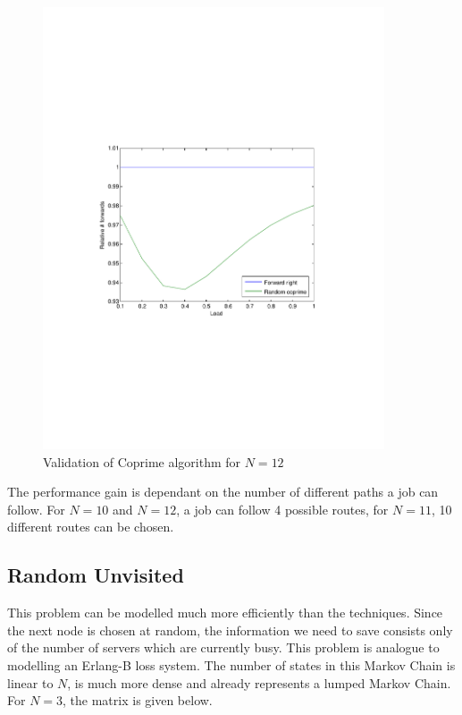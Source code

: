 \documentclass[10pt,a4paper]{article}
\begin{document}
\begin{figure}[h!tb]
\centering
\includegraphics[clip=true, trim=9em 24em 9em 24em, width=0.9\textwidth]{resources/plotrandcoprime12.pdf}
\caption{Validation of Coprime algorithm for $N=12$}
\label{validcp12}
\end{figure}

The performance gain is dependant on the number of different paths a job can follow. For $N=10$ and $N=12$, a job can follow 4 possible routes, for $N=11$, 10 different routes can be chosen.


\subsection{Random Unvisited}
This problem can be modelled much more efficiently than the techniques. Since the next node is chosen at random, the information we need to save consists only of the number of servers which are currently busy. This problem is analogue to modelling an Erlang-B loss system. The number of states in this Markov Chain is linear to $N$, is much more dense and already represents a lumped Markov Chain. For $N=3$, the matrix is given below.
\end{document}
